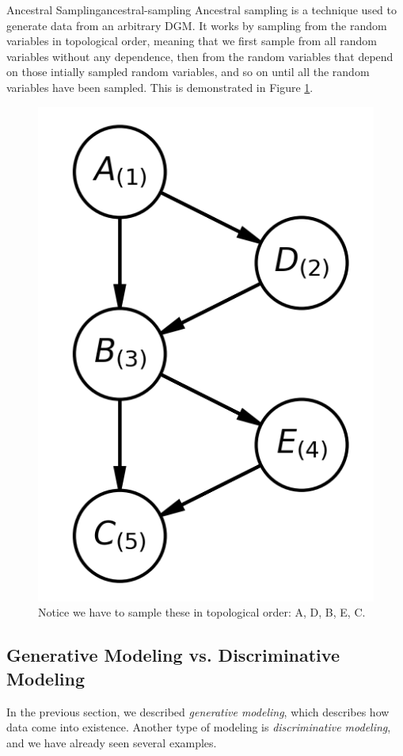 \begin{definition}{Ancestral Sampling}{ancestral-sampling}
	Ancestral sampling is a technique used to generate data from an arbitrary DGM. It works by sampling from the random variables in topological order, meaning that we first sample from all random variables without any dependence, then from the random variables that depend on those intially sampled random variables, and so on until all the random variables have been sampled. This is demonstrated in Figure \ref{fig:ancestral-sampling}.
\end{definition}
\begin{figure}
	\centering
	\includegraphics[width=0.2\paperwidth]{../GraphicalModels/fig/AncestralSampling.png}
    \caption{Notice we have to sample these in topological order: A, D, B, E, C.}
	\label{fig:ancestral-sampling}
\end{figure}

\subsection{Generative Modeling vs. Discriminative Modeling}
In the previous section, we described \textit{generative modeling}, which describes how data come into existence. Another type of modeling is \textit{discriminative modeling}, and we have already seen several examples. 

